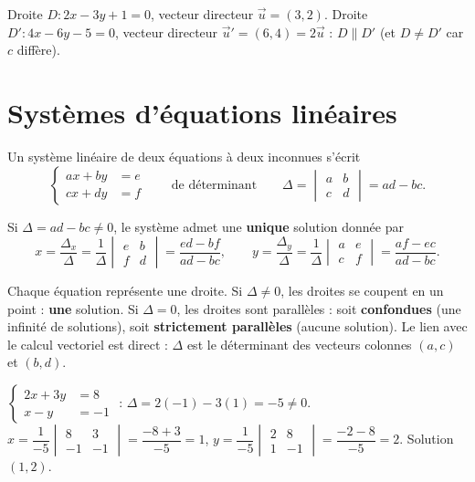 \begin{exemple}
Droite $D:2x-3y+1=0$, vecteur directeur $\vec u=(3,2)$. Droite $D':4x-6y-5=0$, vecteur directeur
$\vec u'=(6,4)=2\vec u$ : $D\parallel D'$ (et $D\neq D'$ car $c$ diffère).
\end{exemple}

\section{Systèmes d'équations linéaires}

\begin{definition}
Un système linéaire de deux équations à deux inconnues s'écrit
\[
\left\{\begin{aligned} ax+by&=e\\ cx+dy&=f \end{aligned}\right.
\qquad\text{de déterminant}\qquad \Delta=\begin{vmatrix}a&b\\ c&d\end{vmatrix}=ad-bc.
\]
\end{definition}

\begin{theoreme}
Si $\Delta=ad-bc\neq0$, le système admet une \textbf{unique} solution donnée par
\[
x=\frac{\Delta_x}{\Delta}=\frac{1}{\Delta}\begin{vmatrix}e&b\\ f&d\end{vmatrix}=\frac{ed-bf}{ad-bc},
\qquad
y=\frac{\Delta_y}{\Delta}=\frac{1}{\Delta}\begin{vmatrix}a&e\\ c&f\end{vmatrix}=\frac{af-ec}{ad-bc}.
\]
\end{theoreme}

\begin{remarque}[Interprétation et cas $\Delta=0$]
Chaque équation représente une droite. Si $\Delta\neq0$, les droites se coupent en un point :
\textbf{une} solution. Si $\Delta=0$, les droites sont parallèles : soit \textbf{confondues}
(une infinité de solutions), soit \textbf{strictement parallèles} (aucune solution). Le lien avec
le calcul vectoriel est direct : $\Delta$ est le déterminant des vecteurs colonnes $(a,c)$ et
$(b,d)$.
\end{remarque}

\begin{exemple}
$\left\{\begin{aligned}2x+3y&=8\\ x-y&=-1\end{aligned}\right.$ : $\Delta=2(-1)-3(1)=-5\neq0$.
$x=\dfrac{1}{-5}\begin{vmatrix}8&3\\-1&-1\end{vmatrix}=\dfrac{-8+3}{-5}=1$,\;
$y=\dfrac{1}{-5}\begin{vmatrix}2&8\\1&-1\end{vmatrix}=\dfrac{-2-8}{-5}=2$. Solution $(1,2)$.
\end{exemple}

